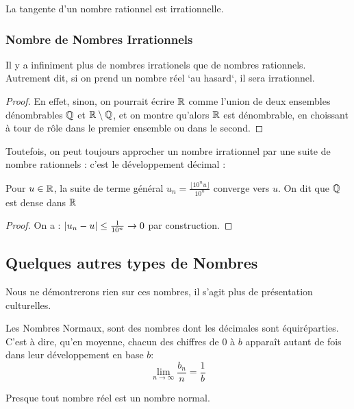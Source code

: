 \documentclass{cours}
\begin{document}
    \begin{corollary}
        La tangente d'un nombre rationnel est irrationnelle.
    \end{corollary}

    \subsubsection{Nombre de Nombres Irrationnels}
    \begin{theorem}
        Il y a infiniment plus de nombres irrationels que de nombres rationnels. Autrement dit, si on prend un nombre réel `au hasard`, il sera irrationnel.
    \end{theorem}
    \begin{proof}
        En effet, sinon, on pourrait écrire $\mathbb{R}$ comme l'union de deux ensembles dénombrables $\mathbb{Q}$ et $\mathbb{R}\setminus\mathbb{Q}$, et on montre qu'alors $\mathbb{R}$ est dénombrable, en choissant à tour de rôle dans le premier ensemble ou dans le second.
    \end{proof}

    Toutefois, on peut toujours approcher un nombre irrationnel par une suite de nombre rationnels : c'est le développement décimal :
    
    \begin{theorem}
        Pour $u \in \mathbb{R}$, la suite de terme général $u_{n} = \frac{\lfloor 10^{n}u\rfloor}{10^{n}}$ converge vers $u$. On dit que $\mathbb{Q}$ est dense dans $\mathbb{R}$
    \end{theorem}
    \begin{proof}
        On a : $\left|u_{n} - u\right| \leq \frac{1}{10^{n}} \to 0$ par construction.
    \end{proof}

    \subsection{Quelques autres types de Nombres}
    Nous ne démontrerons rien sur ces nombres, il s'agit plus de présentation culturelles.
    \begin{definition}
        Les Nombres Normaux, sont des nombres dont les décimales sont équiréparties. C'est à dire, qu'en moyenne, chacun des chiffres de $0$ à $b$ apparaît autant de fois dans leur développement en base $b$: 
    \[
        \lim_{n \to \infty} \frac{b_{n}}{n} = \frac{1}{b}
    \]        
    \end{definition}

    Presque tout nombre réel est un nombre normal.
\end{document}
